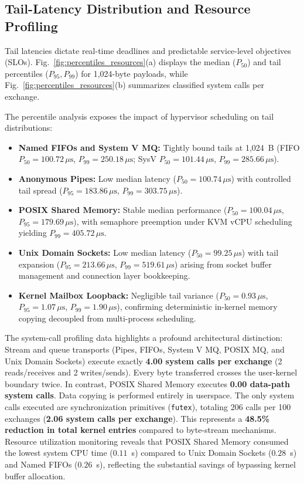 \subsection{Tail-Latency Distribution and Resource Profiling}
Tail latencies dictate real-time deadlines and predictable service-level objectives (SLOs). Fig.~\ref{fig:percentiles_resources}(a) displays the median ($P_{50}$) and tail percentiles ($P_{95}, P_{99}$) for 1,024-byte payloads, while Fig.~\ref{fig:percentiles_resources}(b) summarizes classified system calls per exchange.

The percentile analysis exposes the impact of hypervisor scheduling on tail distributions:
\begin{itemize}[leftmargin=*,noitemsep,topsep=1.5pt]
    \item \textbf{Named FIFOs and System V MQ:} Tightly bound tails at 1,024~B (FIFO $P_{50} = 100.72\,\mu\text{s}$, $P_{99} = 250.18\,\mu\text{s}$; SysV $P_{50} = 101.44\,\mu\text{s}$, $P_{99} = 285.66\,\mu\text{s}$).
    \item \textbf{Anonymous Pipes:} Low median latency ($P_{50} = 100.74\,\mu\text{s}$) with controlled tail spread ($P_{95} = 183.86\,\mu\text{s}$, $P_{99} = 303.75\,\mu\text{s}$).
    \item \textbf{POSIX Shared Memory:} Stable median performance ($P_{50} = 100.04\,\mu\text{s}$, $P_{95} = 179.69\,\mu\text{s}$), with semaphore preemption under KVM vCPU scheduling yielding $P_{99} = 405.72\,\mu\text{s}$.
    \item \textbf{Unix Domain Sockets:} Low median latency ($P_{50} = 99.25\,\mu\text{s}$) with tail expansion ($P_{95} = 213.66\,\mu\text{s}$, $P_{99} = 519.61\,\mu\text{s}$) arising from socket buffer management and connection layer bookkeeping.
    \item \textbf{Kernel Mailbox Loopback:} Negligible tail variance ($P_{50} = 0.93\,\mu\text{s}$, $P_{95} = 1.07\,\mu\text{s}$, $P_{99} = 1.90\,\mu\text{s}$), confirming deterministic in-kernel memory copying decoupled from multi-process scheduling.
\end{itemize}

The system-call profiling data highlights a profound architectural distinction:
Stream and queue transports (Pipes, FIFOs, System V MQ, POSIX MQ, and Unix Domain Sockets) execute exactly \textbf{4.00 system calls per exchange} (2 reads/receives and 2 writes/sends). Every byte transferred crosses the user-kernel boundary twice.
In contrast, POSIX Shared Memory executes \textbf{0.00 data-path system calls}. Data copying is performed entirely in userspace. The only system calls executed are synchronization primitives (\texttt{futex}), totaling 206 calls per 100 exchanges (\textbf{2.06 system calls per exchange}). This represents a \textbf{48.5\% reduction in total kernel entries} compared to byte-stream mechanisms.
Resource utilization monitoring reveals that POSIX Shared Memory consumed the lowest system CPU time ($0.11$~s) compared to Unix Domain Sockets ($0.28$~s) and Named FIFOs ($0.26$~s), reflecting the substantial savings of bypassing kernel buffer allocation.

